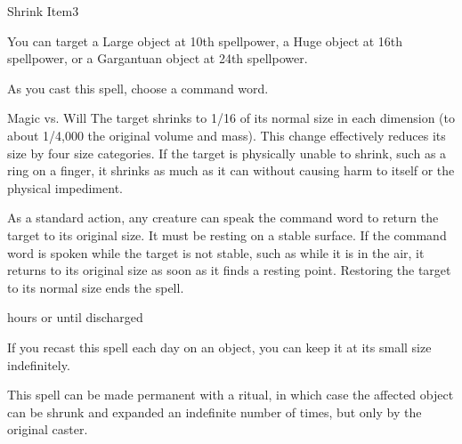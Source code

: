 \begin{spellsection}{Shrink Item}{3}
    \begin{spellheader}
    \end{spellheader}
    \begin{spellcontent}
        \begin{spelltargetinginfo}
            \spellspecial You can target a Large object at 10th spellpower, a Huge object at 16th spellpower, or a Gargantuan object at 24th spellpower.
        \end{spelltargetinginfo}
        \begin{spelleffects}
            \spellspecial As you cast this spell, choose a command word.
            \begin{spellattack}{Magic vs. Will}
                \spellsuccess The target shrinks to 1/16 of its normal size in each dimension (to about 1/4,000 the original volume and mass). This change effectively reduces its size by four size categories. If the target is physically unable to shrink, such as a ring on a finger, it shrinks as much as it can without causing harm to itself or the physical impediment.

                As a standard action, any creature can speak the command word to return the target to its original size. It must be resting on a stable surface. If the command word is spoken while the target is not stable, such as while it is in the air, it returns to its original size as soon as it finds a resting point. Restoring the target to its normal size ends the spell.
            \end{spellattack}
             hours or until discharged
        \end{spelleffects}
    \end{spellcontent}
    \begin{spellfooter}
        \spellnotes  If you recast this spell each day on an object, you can keep it at its small size indefinitely.

        This spell can be made permanent with a  ritual, in which case the affected object can be shrunk and expanded an indefinite number of times, but only by the original caster.
        \miscastrandom
    \end{spellfooter}
\end{spellsection}

